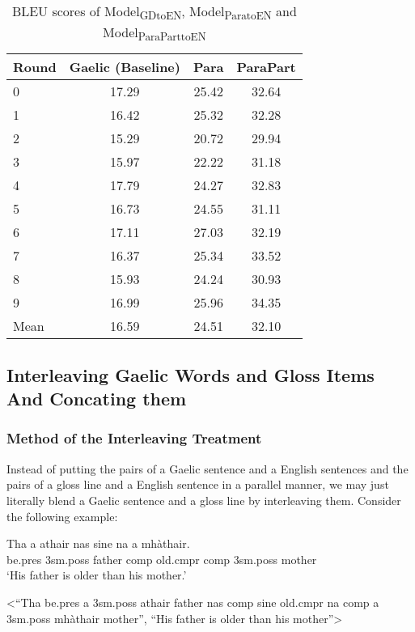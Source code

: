 \documentclass[final]{ua-thesis}
\numberwithin{equation}{section}
\begin{document}
\begin{table}[ht]
\centering
\begin{tabular}{lccc}
  \hline
Round & Gaelic (Baseline) & Para & ParaPart \\ 
  \hline
0 & 17.29 & 25.42 & 32.64 \\ 
  1 & 16.42 & 25.32 & 32.28 \\ 
  2 & 15.29 & 20.72 & 29.94 \\ 
  3 & 15.97 & 22.22 & 31.18 \\ 
  4 & 17.79 & 24.27 & 32.83 \\ 
  5 & 16.73 & 24.55 & 31.11 \\ 
  6 & 17.11 & 27.03 & 32.19 \\ 
  7 & 16.37 & 25.34 & 33.52 \\ 
  8 & 15.93 & 24.24 & 30.93 \\ 
  9 & 16.99 & 25.96 & 34.35 \\ 
   \hline
Mean & 16.59 & 24.51 & 32.10 \\ 
   \hline
\end{tabular}
\caption{BLEU scores of Model\textsubscript{GDtoEN}, Model\textsubscript{ParatoEN} and Model\textsubscript{ParaParttoEN} } 
\label{Table:Concating}
\end{table}
\subsection{Interleaving Gaelic Words and Gloss Items And Concating them}\label{treatment:InterleavingAndConCat}
\subsubsection{Method of the Interleaving Treatment}
Instead of putting the pairs of a Gaelic sentence and a English sentences and the pairs of a gloss line and a English sentence in a parallel manner, we may just literally blend a Gaelic sentence and a gloss line by interleaving them. Consider the following example:

\begin{exe} 
\ex 
	\begin{xlist}
	\ex \label{ex_interleave:in}
		\gll	 Tha a athair nas sine na a mh\`athair.\\  
     		     be.pres 3sm.poss father comp old.cmpr comp 3sm.poss mother \\
    	\glt    `His father is older than his mother.'  

    \ex \label{ex_interleave:out} <``Tha be.pres a 3sm.poss athair father nas comp sine old.cmpr na comp a 3sm.poss mh\`athair mother'', ``His father is older than his mother''>
    \end{xlist}
\end{exe}
\end{document}
